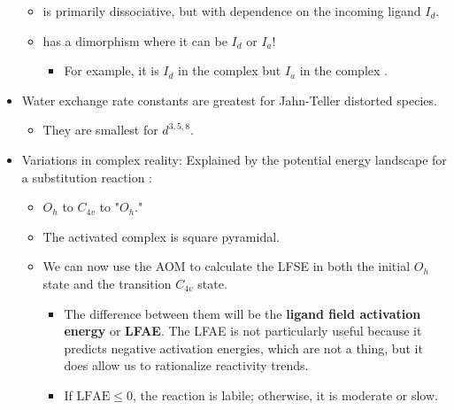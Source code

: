 \documentclass[../notes.tex]{subfiles}
\begin{document}
\begin{itemize}
    \begin{itemize}
        \item {} is primarily dissociative, but with dependence on the incoming ligand $I_d$.
        \item {} has a dimorphism where it can be $I_d$ or $I_a$!
        \begin{itemize}
            \item For example, it is $I_d$ in the complex  but $I_a$ in the complex .
        \end{itemize}
    \end{itemize}
    \item Water exchange rate constants are greatest for Jahn-Teller distorted species.
    \begin{itemize}
        \item They are smallest for $d^{3,5,8}$.
    \end{itemize}
    \item Variations in complex reality: Explained by the potential energy landscape for a substitution reaction :
    \begin{itemize}
        \item $O_h$ to $C_{4v}$ to "$O_h$."
        \item The activated complex is square pyramidal.
        \item We can now use the AOM to calculate the LFSE in both the initial $O_h$ state and the transition $C_{4v}$ state.
        \begin{itemize}
            \item The difference between them will be the \textbf{ligand field activation energy} or \textbf{LFAE}. The LFAE is not particularly useful because it predicts negative activation energies, which are not a thing, but it does allow us to rationalize reactivity trends.
            \item If $\text{LFAE}\leq 0$, the reaction is labile; otherwise, it is moderate or slow.
        \end{itemize}
    \end{itemize}
\end{itemize}
\end{document}
